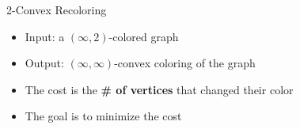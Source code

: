 \begin{frame}{2-Convex Recoloring}
\begin{itemize}


\item
Input: a $(\infty, 2)$-colored graph

\pause\item
Output: $(\infty, \infty)$-convex coloring of the graph

\pause\item
The cost is the \textbf{\# of vertices} that changed their color

\pause\item
The goal is to minimize the cost


\end{itemize}
\pause
\end{frame}
